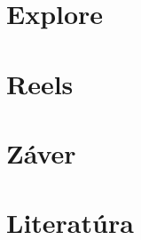 \documentclass[10pt,twoside,slovak,a4paper]{article}
\begin{document}
\section{Explore} \label{stvrta}




\section{Reels} \label{piata}



\section{Záver} \label{siesta} %
\section{Literatúra} 





\end{document}
